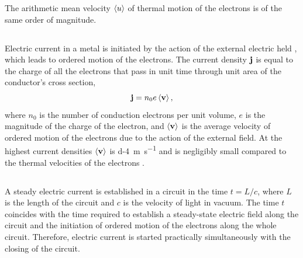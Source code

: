 The arithmetic mean velocity $\expval{u}$ of thermal motion of the electrons  is of the same order of magnitude.

\subsection{}\label{20.3.2} Electric current in a metal is initiated by the action of the external electric held , which leads to ordered motion of the electrons. The current density $\vb{j}$ is equal to the charge of all the electrons that pass in unit time through unit area of the conductor's cross section,
\begin{equation*}%
\vb{j} = n_{0} e  \expval{\vb{v}},
\end{equation*}
where $n_{0}$ is the number of conduction electrons per unit volume, $e$ is the magnitude of the charge of the electron, and $\expval{\vb{v}}$ is the average velocity of ordered motion of the electrons due to the action of the external field. At the highest current densities $\expval{\vb{v}}$ is \SI{d-4}{\meter\per\second} and is negligibly small compared to the thermal velocities of the electrons .

\subsection{}\label{20.3.3} A steady electric current is established in a circuit in the time $t = L/c$, where $L$ is the length of the circuit and $c$ is the velocity of light in vacuum. The time $t$ coincides with the time required to establish a steady-state electric field along the circuit and the initiation of ordered motion of the electrons along the whole circuit. Therefore, electric current is started practically simultaneously with the closing of the circuit. 

